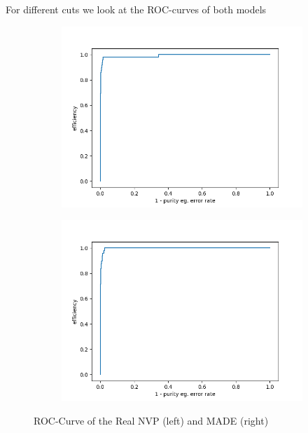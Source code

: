 \documentclass[%
 reprint,
 amsmath,amssymb,
 aps,
]{revtex4-2}
\begin{document}
For different cuts we look at the ROC-curves of both models 
 \begin{figure}[ht]
	\centering
	\begin{subfigure}[h]{0.4\textwidth}
		\centering
		\includegraphics[width=\textwidth]{figs/ROC_validation_Real_NVP.png}
	\end{subfigure}
	\hfill
	\begin{subfigure}[h]{0.4\textwidth}  
		\centering 
		\includegraphics[width=\textwidth]{figs/ROC_validation_MADE.png}
	\end{subfigure}
	\caption[ ROC-Curve of the Real NVP (left) and MADE (right)]
	{\small ROC-Curve of the Real NVP (left) and MADE (right)} 
	\label{fig:ROC}
\end{figure}
\end{document}
